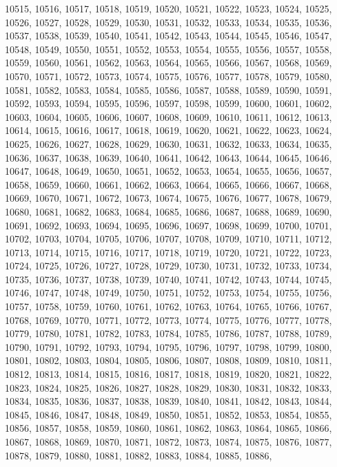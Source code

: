10515,
10516,
10517,
10518,
10519,
10520,
10521,
10522,
10523,
10524,
10525,
10526,
10527,
10528,
10529,
10530,
10531,
10532,
10533,
10534,
10535,
10536,
10537,
10538,
10539,
10540,
10541,
10542,
10543,
10544,
10545,
10546,
10547,
10548,
10549,
10550,
10551,
10552,
10553,
10554,
10555,
10556,
10557,
10558,
10559,
10560,
10561,
10562,
10563,
10564,
10565,
10566,
10567,
10568,
10569,
10570,
10571,
10572,
10573,
10574,
10575,
10576,
10577,
10578,
10579,
10580,
10581,
10582,
10583,
10584,
10585,
10586,
10587,
10588,
10589,
10590,
10591,
10592,
10593,
10594,
10595,
10596,
10597,
10598,
10599,
10600,
10601,
10602,
10603,
10604,
10605,
10606,
10607,
10608,
10609,
10610,
10611,
10612,
10613,
10614,
10615,
10616,
10617,
10618,
10619,
10620,
10621,
10622,
10623,
10624,
10625,
10626,
10627,
10628,
10629,
10630,
10631,
10632,
10633,
10634,
10635,
10636,
10637,
10638,
10639,
10640,
10641,
10642,
10643,
10644,
10645,
10646,
10647,
10648,
10649,
10650,
10651,
10652,
10653,
10654,
10655,
10656,
10657,
10658,
10659,
10660,
10661,
10662,
10663,
10664,
10665,
10666,
10667,
10668,
10669,
10670,
10671,
10672,
10673,
10674,
10675,
10676,
10677,
10678,
10679,
10680,
10681,
10682,
10683,
10684,
10685,
10686,
10687,
10688,
10689,
10690,
10691,
10692,
10693,
10694,
10695,
10696,
10697,
10698,
10699,
10700,
10701,
10702,
10703,
10704,
10705,
10706,
10707,
10708,
10709,
10710,
10711,
10712,
10713,
10714,
10715,
10716,
10717,
10718,
10719,
10720,
10721,
10722,
10723,
10724,
10725,
10726,
10727,
10728,
10729,
10730,
10731,
10732,
10733,
10734,
10735,
10736,
10737,
10738,
10739,
10740,
10741,
10742,
10743,
10744,
10745,
10746,
10747,
10748,
10749,
10750,
10751,
10752,
10753,
10754,
10755,
10756,
10757,
10758,
10759,
10760,
10761,
10762,
10763,
10764,
10765,
10766,
10767,
10768,
10769,
10770,
10771,
10772,
10773,
10774,
10775,
10776,
10777,
10778,
10779,
10780,
10781,
10782,
10783,
10784,
10785,
10786,
10787,
10788,
10789,
10790,
10791,
10792,
10793,
10794,
10795,
10796,
10797,
10798,
10799,
10800,
10801,
10802,
10803,
10804,
10805,
10806,
10807,
10808,
10809,
10810,
10811,
10812,
10813,
10814,
10815,
10816,
10817,
10818,
10819,
10820,
10821,
10822,
10823,
10824,
10825,
10826,
10827,
10828,
10829,
10830,
10831,
10832,
10833,
10834,
10835,
10836,
10837,
10838,
10839,
10840,
10841,
10842,
10843,
10844,
10845,
10846,
10847,
10848,
10849,
10850,
10851,
10852,
10853,
10854,
10855,
10856,
10857,
10858,
10859,
10860,
10861,
10862,
10863,
10864,
10865,
10866,
10867,
10868,
10869,
10870,
10871,
10872,
10873,
10874,
10875,
10876,
10877,
10878,
10879,
10880,
10881,
10882,
10883,
10884,
10885,
10886,
